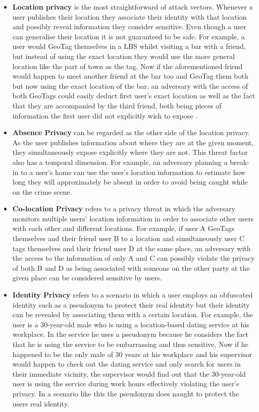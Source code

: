 \documentclass[english]{tktltiki2}
\theoremstyle{definition}
\theoremstyle{remark}
\begin{document}
\begin{itemize}
\item \textbf{Location privacy} is the most straightforward of attack vectors. Whenever a user publishes their location they associate their identity with that location and possibly reveal information they consider sensitive. Even though a user can generalise their location it is not guaranteed to be safe. For example, a user would GeoTag themselves in a LBS whilst visiting a bar with a friend, but instead of using the exact location they would use the more general location like the part of town as the tag. Now if the aforementioned friend would happen to meet another friend at the bar too and GeoTag them both but now using the exact location of the bar, an adversary with the access of both GeoTags could easily deduct first user's exact location as well as the fact that they are accompanied by the third friend, both being pieces of information the first user did not explicitly wish to expose \cite{LocationPrivacy}.
\item \textbf{Absence Privacy} can be regarded as the other side of the location privacy. As the user publishes information about where they are at the given moment, they simultaneously expose explicitly where they are not. This threat factor also has a temporal dimension. For example, an adversary planning a break-in to a user's home can use the user's location information to estimate how long they will approximately be absent in order to avoid being caught while on the crime scene.
\item \textbf{Co-location Privacy} refers to a privacy threat in which the adversary monitors multiple users' location information in order to associate other users with each other and different locations. For example, if user A GeoTags themselves and their friend user B to a location and simultaneously user C tags themselves and their friend user D at the same place, an adversary with the access to the information of only A and C can possibly violate the privacy of both B and D as being associated with someone on the other party at the given place can be considered sensitive by users.
\item \textbf{Identity Privacy} refers to a scenario in which a user employs an obfuscated identity such as a pseudonym to protect their real identity but their identity can be revealed by associating them with a certain location. For example, the user is a 30-year-old male who is using a location-based dating service at his workplace. In the service he uses a pseudonym because he considers the fact that he is using the service to be embarrassing and thus sensitive. Now if he happened to be the only male of 30 years at his workplace and his supervisor would happen to check out the dating service and only search for users in their immediate vicinity, the supervisor would find out that the 30-year-old user is using the service during work hours effectively violating the user's privacy. In a scenario like this the pseudonym does naught to protect the users real identity.
\end{itemize}
\end{document}
